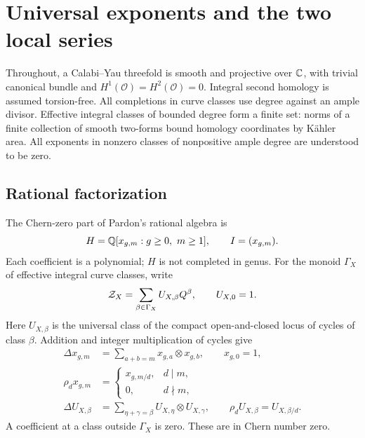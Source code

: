 \section{Universal exponents and the two local series}\label{sec:universal}

Throughout, a Calabi--Yau threefold is smooth and projective over
$\mathbb C$, with trivial canonical bundle and
$H^1(\mathcal O)=H^2(\mathcal O)=0$. Integral second homology is
assumed torsion-free. All completions in curve classes use degree
against an ample divisor. Effective integral classes of bounded
degree form a finite set: norms of a finite collection of smooth
two-forms bound homology coordinates by K\"ahler area.
All exponents in nonzero classes of nonpositive ample degree are
understood to be zero.

\subsection{Rational factorization}
The Chern-zero part of Pardon's rational algebra is
\[
 H=\mathbb Q[x_{g,m}:g\ge0,\ m\ge1],\qquad I=(x_{g,m}).
\]
Each coefficient is a polynomial; $H$ is not completed in genus.
For the monoid $\Gamma_X$ of effective integral curve classes,
write
\[
 \mathcal Z_X=\sum_{\beta\in\Gamma_X}U_{X,\beta}Q^\beta,
 \qquad U_{X,0}=1.
\]
Here $U_{X,\beta}$ is the universal class of the compact
open-and-closed locus of cycles of class $\beta$. Addition and
integer multiplication of cycles give
\begin{equation}\label{eq:operations}
 \begin{split}
 \Delta x_{g,m}&=\sum_{a+b=m}x_{g,a}\otimes x_{g,b},\qquad x_{g,0}=1,\\
 \rho_d x_{g,m}&=\begin{cases}x_{g,m/d},&d\mid m,\\0,&d\nmid m,\end{cases}\\
 \Delta U_{X,\beta}&=\sum_{\eta+\gamma=\beta}U_{X,\eta}\otimes U_{X,\gamma},
 \qquad \rho_dU_{X,\beta}=U_{X,\beta/d}.
 \end{split}
\end{equation}
A coefficient at a class outside $\Gamma_X$ is zero. These are
\cite[Definitions 3.9 and 3.12, Lemmas 4.12--4.13 and Theorem 7.6]{Pardon}
in Chern number zero.


